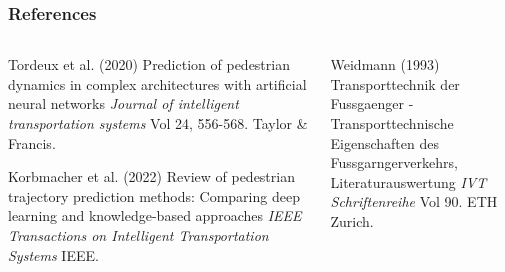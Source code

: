 \begin{frame} %
	\frametitle{References}
	\begin{columns}
    \begin{column}{0.5\textwidth}  %
        \begin{thebibliography}{99} %
    		\footnotesize %
               Tordeux et al. (2020)
                \newblock Prediction of pedestrian dynamics in complex architectures with artificial neural networks
                \newblock \emph{Journal of intelligent transportation systems} Vol 24, 556-568. Taylor \& Francis.
        
               Korbmacher et al. (2022)
                \newblock Review of pedestrian trajectory prediction methods: Comparing deep learning and knowledge-based approaches
                \newblock \emph{IEEE Transactions on Intelligent Transportation Systems} IEEE.
    	\end{thebibliography}
    \end{column}
    \begin{column}{0.5\textwidth}  %
        \begin{thebibliography}{99} %
    		\footnotesize %
               Weidmann (1993)
                \newblock Transporttechnik der Fussgaenger -\\
                Transporttechnische Eigenschaften des Fussgarngerverkehrs, Literaturauswertung
                \newblock \emph{IVT Schriftenreihe} Vol 90. ETH Zurich.
    	\end{thebibliography}
    \end{column}
    \end{columns}
\end{frame}

\section{}

